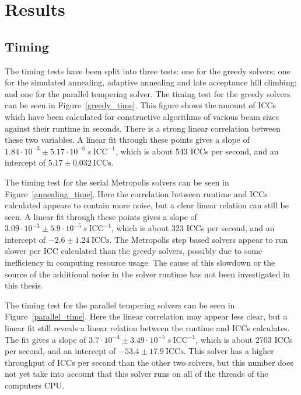 \chapter{Results}\label{results}
\section{Timing}
The timing tests have been split into three tests: one for the greedy solvers; one for the simulated annealing, adaptive annealing and late acceptance hill climbing; and one for the parallel tempering solver. The timing test for the greedy solvers can be seen in Figure~\ref{greedy_time}. This figure shows the amount of ICCs which have been calculated for constructive algorithms of various beam sizes against their runtime in seconds. There is a strong linear correlation between these two variables. A linear fit through these points gives a slope of \(1.84\cdot 10^{-3} \pm 5.17\cdot 10^{-6}\ s\ \text{ICC}^{-1}\), which is about 543 ICCs per second, and an intercept of \(5.17 \pm 0.032\ \text{ICCs}\). 

The timing test for the serial Metropolis solvers can be seen in Figure~\ref{annealing_time}. Here the correlation between runtime and ICCs calculated appears to contain more noise, but a clear linear relation can still be seen. A linear fit through these points gives a slope of \(3.09\cdot 10^{-3} \pm 5.9\cdot 10^{-5}\ s\ \text{ICC}^{-1}\), which is about 323 ICCs per second, and an intercept of \(-2.6 \pm 1.24\ \text{ICCs}\). The Metropolis step based solvers appear to run slower per ICC calculated than the greedy solvers, possibly due to some inefficiency in computing resource usage. The cause of this slowdown or the source of the additional noise in the solver runtime has not been investigated in this thesis.

The timing test for the parallel tempering solvers can be seen in Figure~\ref{parallel_time}. Here the linear correlation may appear less clear, but a linear fit still reveals a linear relation between the runtime and ICCs calculates. The fit gives a slope of \(3.7\cdot 10^{-4} \pm 3.49\cdot 10^{-5}\ s\ \text{ICC}^{-1}\), which is about 2703 ICCs per second, and an intercept of \(-53.4 \pm 17.9\ \text{ICCs}\). This solver has a higher throughput of ICCs per second than the other two solvers, but this number does not yet take into account that this solver runs on all of the threads of the computers CPU.\@ 

